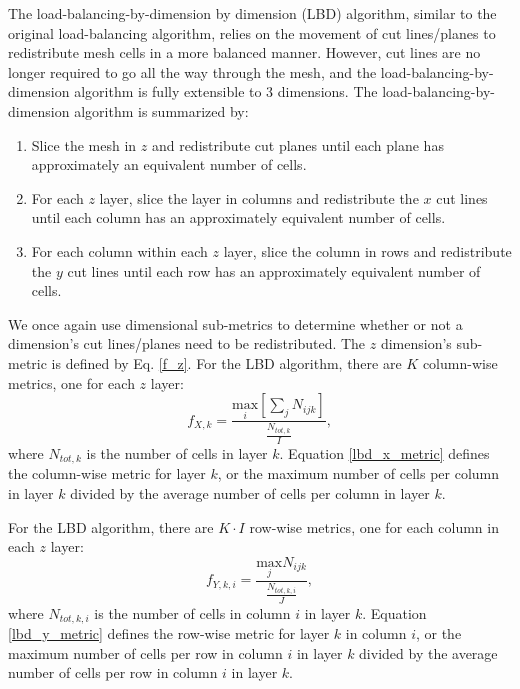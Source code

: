 The load-balancing-by-dimension by dimension (LBD) algorithm, similar to the original load-balancing algorithm, relies on the movement of cut lines/planes to redistribute mesh cells in a more balanced manner.
However, cut lines are no longer required to go all the way through the mesh, and the load-balancing-by-dimension algorithm is fully extensible to 3 dimensions.
The load-balancing-by-dimension algorithm is summarized by:
\begin{enumerate}
  \item Slice the mesh in $z$ and redistribute cut planes until each plane has approximately an equivalent number of cells.
  \item For each $z$ layer, slice the layer in columns and redistribute the $x$ cut lines until each column has an approximately equivalent number of cells.
  \item For each column within each $z$ layer, slice the column in rows and redistribute the $y$ cut lines until each row has an approximately equivalent number of cells.
\end{enumerate}

We once again use dimensional sub-metrics to determine whether or not a dimension's cut lines/planes need to be redistributed. The $z$ dimension's sub-metric is defined by Eq. \ref{f_z}. For the LBD algorithm, there are $K$ column-wise metrics, one for each $z$ layer:
\begin{equation}
f_{X,k} = \frac{ \underset{i}{\text{max}}[ \sum_{j} N_{ijk}]  }  {\frac{N_{tot,k}}{I}},
\label{lbd_x_metric}
\end{equation}
where $N_{tot,k}$ is the number of cells in layer $k$.
Equation \ref{lbd_x_metric} defines the column-wise metric for layer $k$, or the maximum number of cells per column in layer $k$ divided by the average number of cells per column in layer $k$.

For the LBD algorithm, there are $K\cdot I$ row-wise metrics, one for each column in each $z$ layer:
\begin{equation}
f_{Y,k,i} = \frac{\underset{j}{\text{max}} N_{ijk} } {\frac{N_{tot,k,i}}{J}},
\label{lbd_y_metric}
\end{equation}
where $N_{tot,k,i}$ is the number of cells in column $i$ in layer $k$.
Equation \ref{lbd_y_metric} defines the row-wise metric for layer $k$ in column $i$, or the maximum number of cells per row in column $i$ in layer $k$ divided by the average number of cells per row in column $i$ in layer $k$.

